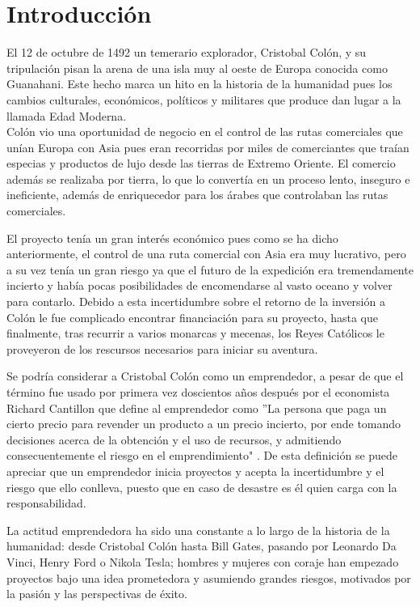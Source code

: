 \chapter{Introducción}

El 12 de octubre de 1492 un temerario explorador, Cristobal Colón, y su tripulación pisan la arena de una isla muy al oeste de Europa conocida como Guanahani. Este hecho marca un hito en la historia de la humanidad pues los cambios culturales, económicos, políticos y militares que produce dan lugar a la llamada Edad Moderna.\\
Colón vio una oportunidad de negocio en el control de las rutas comerciales que unían Europa con Asia pues eran recorridas por miles de comerciantes que traían especias y productos de lujo desde las tierras de Extremo Oriente. El comercio además se realizaba por tierra, lo que lo convertía en un proceso lento, inseguro e ineficiente, además de enriquecedor para los árabes que controlaban las rutas comerciales.

El proyecto tenía un gran interés económico pues como se ha dicho anteriormente, el control de una ruta comercial con Asia era muy lucrativo, pero a su vez tenía un gran riesgo ya que el futuro de la expedición era tremendamente incierto y había pocas posibilidades de encomendarse al vasto oceano y volver para contarlo. Debido a esta incertidumbre sobre el retorno de la inversión a Colón le fue complicado encontrar financiación para su proyecto, hasta que finalmente, tras recurrir a varios monarcas y mecenas,  los Reyes Católicos le proveyeron de los rescursos necesarios para iniciar su aventura.

Se podría considerar a Cristobal Colón como un emprendedor, a pesar de que el término fue usado por primera vez doscientos años después por el economista Richard Cantillon que define al emprendedor como ''La persona que paga un cierto precio para revender un producto a un precio incierto, por ende tomando decisiones acerca de la obtención y el uso de recursos, y admitiendo consecuentemente el riesgo en el emprendimiento" \cite[pág 21]{ashokbhanudasnavale2013}.
De esta definición se puede apreciar que un emprendedor inicia proyectos y acepta la incertidumbre y el riesgo que ello conlleva, puesto que en caso de desastre es él quien carga con la responsabilidad.

La actitud emprendedora ha sido una constante a lo largo de la historia de la humanidad: desde Cristobal Colón hasta Bill Gates, pasando por Leonardo Da Vinci, Henry Ford o Nikola Tesla; hombres y mujeres con coraje han empezado proyectos bajo una idea prometedora y asumiendo grandes riesgos, motivados por la pasión y las perspectivas de éxito. 

